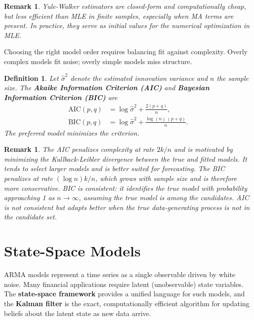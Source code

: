 \documentclass{report}
\theoremstyle{spacedplain}
\theoremstyle{spaceddefinition}
\newtheorem{definition}[theorem]{Definition}
\theoremstyle{spacedremark}
\newtheorem{remark}[theorem]{Remark}
\begin{document}
\begin{remark}
Yule-Walker estimators are closed-form and computationally cheap, but less efficient than MLE in finite samples, especially when MA terms are present. In practice, they serve as initial values for the numerical optimization in MLE.
\end{remark}

Choosing the right model order requires balancing fit against complexity. Overly complex models fit noise; overly simple models miss structure.

\begin{definition}
Let $\hat{\sigma}^2$ denote the estimated innovation variance and $n$ the sample size. The \textbf{Akaike Information Criterion (AIC)} and \textbf{Bayesian Information Criterion (BIC)} are
\begin{align}
    \text{AIC}(p,q) &= \log\hat{\sigma}^2 + \frac{2(p+q)}{n}, \\
    \text{BIC}(p,q) &= \log\hat{\sigma}^2 + \frac{\log(n)\,(p+q)}{n}.
\end{align}
The preferred model minimizes the criterion.
\end{definition}

\begin{remark}
The AIC penalizes complexity at rate $2k/n$ and is motivated by minimizing the Kullback-Leibler divergence between the true and fitted models. It tends to select larger models and is better suited for forecasting. The BIC penalizes at rate $(\log n)k/n$, which grows with sample size and is therefore more conservative. BIC is consistent: it identifies the true model with probability approaching 1 as $n \to \infty$, assuming the true model is among the candidates. AIC is not consistent but adapts better when the true data-generating process is not in the candidate set.
\end{remark}

\section{State-Space Models}
 
ARMA models represent a time series as a single observable driven by white noise. Many financial applications require latent (unobservable) state variables. The \textbf{state-space framework} provides a unified language for such models, and the \textbf{Kalman filter} is the exact, computationally efficient algorithm for updating beliefs about the latent state as new data arrive.
 
\end{document}
